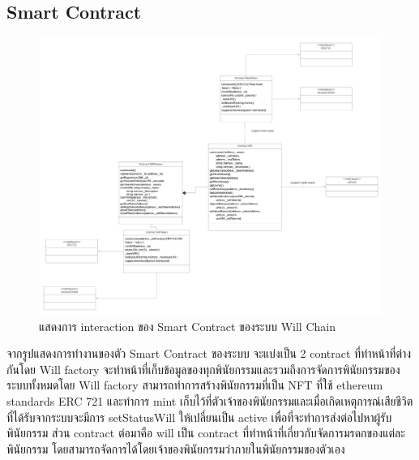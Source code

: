\documentclass[12pt,oneside,openright,a4paper]{cpe-thai-project}
\begin{document}
\subsection{Smart Contract}
	\begin{figure}[!thb]	
		\centering
		\includegraphics[scale=0.3]{smartContractDiagram}
		\caption{แสดงการ interaction ของ Smart Contract ของระบบ Will Chain}
	\end{figure}
	\FloatBarrier
\tab จากรูปแสดงการทำงานของตัว Smart Contract ของระบบ จะแบ่งเป็น 2 contract ที่ทำหน้าที่ต่างกันโดย Will factory จะทำหน้าที่เก็บข้อมูลของทุกพินัยกรรมและรวมถึงการจัดการพินัยกรรมของระบบทั้งหมดโดย Will factory สามารถทำการสร้างพินัยกรรมที่เป็น NFT ที่ใช้ ethereum standards ERC 721 และทำการ mint เก็บไว้ที่ตัวเจ้าของพินัยกรรมและเมื่อเกิดเหตุการณ์เสียชีวิตที่ได้รับจากระบบจะมีการ setStatusWill ให้เปลี่ยนเป็น active เพื่อที่จะทำการส่งต่อไปหาผู้รับพินัยกรรม ส่วน contract ต่อมาคือ will เป็น contract ที่ทำหน้าที่เกี่ยวกับจัดการมรดกของแต่ละพินัยกรรม โดยสามารถจัดการได้โดยเจ้าของพินัยกรรมว่าภายในพินัยกรรมของตัวเอง
\clearpage
\end{document}
